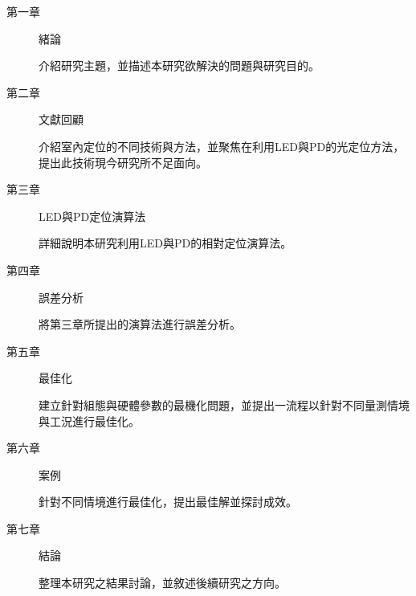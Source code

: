 \begin{description}
    \item[第一章] 緒論
    
    介紹研究主題，並描述本研究欲解決的問題與研究目的。
    
    \item[第二章] 文獻回顧
    
    介紹室內定位的不同技術與方法，並聚焦在利用LED與PD的光定位方法，提出此技術現今研究所不足面向。
    
    \item[第三章] LED與PD定位演算法
    
    詳細說明本研究利用LED與PD的相對定位演算法。

    \item[第四章] 誤差分析
    
    將第三章所提出的演算法進行誤差分析。
    
    \item[第五章] 最佳化
    
    建立針對組態與硬體參數的最機化問題，並提出一流程以針對不同量測情境與工況進行最佳化。
    
    \item[第六章] 案例
    
    針對不同情境進行最佳化，提出最佳解並探討成效。
    
    \item[第七章] 結論
    
    整理本研究之結果討論，並敘述後續研究之方向。
    
    \end{description}







